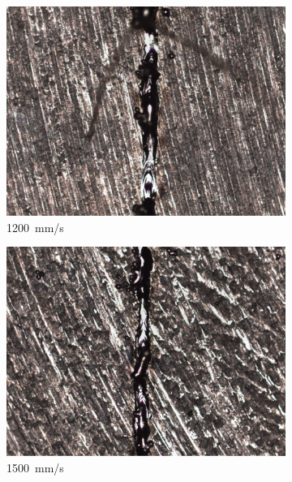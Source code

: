 \documentclass{article}
\begin{document}
\begin{figure}
\begin{subfigure}[b]{0.24\textwidth}
        \includegraphics[width=\textwidth]{experiment/photos/90W_V1200}
        \caption{\SI{1200}{mm/s}}
    \end{subfigure}\:
    \begin{subfigure}[b]{0.24\textwidth}
        \includegraphics[width=\textwidth]{experiment/photos/90W_V1500}
        \caption{\SI{1500}{mm/s}}
    \end{subfigure}\:
    \begin{subfigure}[b]{0.24\textwidth}

\end{subfigure}
\end{figure}
\end{document}
